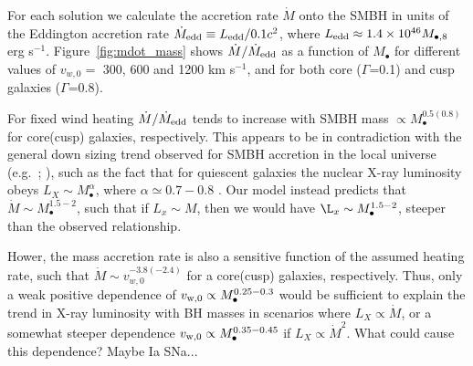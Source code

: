 \documentclass[usenatbib,fleqn]{mn2e}
\newcommand{\Mdot}{\dot{M}}
\newcommand{\eddr}{\dot{M}/\dot{M}_{\rm Edd}}
\newcommand{\Mbh}[1][]{M_{\bullet#1}}
\newcommand{\vwO}{v_{w,0}}
\begin{document}
For each solution we calculate the accretion rate $\dot{M}$ onto the SMBH in units of the Eddington accretion rate $\dot{M}_{\rm edd} \equiv L_{\rm edd}/0.1 c^{2}$, where $L_{\rm edd} \approx 1.4\times 10^{46}M_{\bullet,8}$ erg s$^{-1}$.  Figure~\ref{fig:mdot_mass} shows $\dot{M}/\dot{M}_{\rm edd}$ as a function of $\Mbh$ for different
values of $\vwO =$ 300, 600 and 1200 km s$^{-1}$, and for
both core ($\Gamma$=0.1) and cusp galaxies ($\Gamma$=0.8).

For fixed wind heating $\dot{M}/\dot{M}_{\rm edd}$ tends to increase with SMBH mass  $\propto  M_{\bullet}^{0.5(0.8)}$ for core(cusp) galaxies, respectively.  This appears to be in contradiction with the general down sizing trend observed for SMBH accretion in the local
universe (e.g.~\citealt{Heckman+04}; \citealt{Gallo+08}), such as the fact that for quiescent galaxies the nuclear X-ray luminosity obeys $L_X \sim \Mbh^\alpha$, where $\alpha\simeq 0.7-0.8$ \citep{MillerGallo+:2014a}.  Our model instead predicts that $\Mdot
\sim \Mbh^{1.5-2}$, such that if $L_x\sim M$, then we would have $\L_x
\sim \Mbh^{1.5-2}$, steeper than the observed relationship.  

Hower, the mass accretion rate is also a sensitive function of the assumed heating rate, such that $\dot{M}\sim\vwO^{-3.8(-2.4)}$ for a core(cusp) galaxies, respectively.  Thus, only a weak positive dependence of $v_{\rm w,0} \propto M_{\bullet}^{0.25-0.3}$ would be sufficient to explain the trend in X-ray luminosity with BH masses in scenarios where $L_X \propto \dot{M}$, or a somewhat steeper dependence $v_{\rm w,0} \propto M_{\bullet}^{0.35-0.45}$ if $L_{X} \propto \dot{M}^{2}$.  What could cause this dependence?  Maybe Ia SNa...

\end{document}

